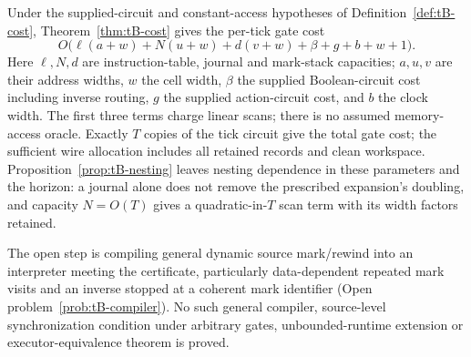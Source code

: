 Under the supplied-circuit and constant-access hypotheses of Definition~\ref{def:tB-cost}, Theorem~\ref{thm:tB-cost} gives the per-tick gate cost
\[
 O\bigl(\ell(a+w)+N(u+w)+d(v+w)+\beta+g+b+w+1\bigr).
\]
Here $\ell,N,d$ are instruction-table, journal and mark-stack capacities; $a,u,v$ are their address widths, $w$ the cell width, $\beta$ the supplied Boolean-circuit cost including inverse routing, $g$ the supplied action-circuit cost, and $b$ the clock width. The first three terms charge linear scans; there is no assumed memory-access oracle. Exactly $T$ copies of the tick circuit give the total gate cost; the sufficient wire allocation includes all retained records and clean workspace. Proposition~\ref{prop:tB-nesting} leaves nesting dependence in these parameters and the horizon: a journal alone does not remove the prescribed expansion's doubling, and capacity $N=O(T)$ gives a quadratic-in-$T$ scan term with its width factors retained.

The open step is compiling general dynamic source mark/rewind into an interpreter meeting the certificate, particularly data-dependent repeated mark visits and an inverse stopped at a coherent mark identifier (Open problem~\ref{prob:tB-compiler}). No such general compiler, source-level synchronization condition under arbitrary gates, unbounded-runtime extension or executor-equivalence theorem is proved.


